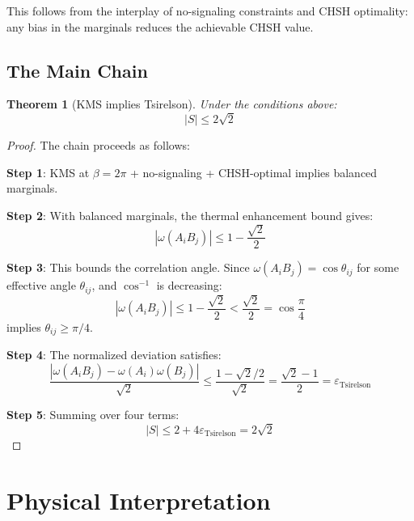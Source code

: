 \documentclass[12pt,a4paper]{article}
\newtheorem{theorem}{Theorem}[section]
\newcommand{\eps}{\varepsilon}
\begin{document}
This follows from the interplay of no-signaling constraints and CHSH optimality: any bias in the marginals reduces the achievable CHSH value.

\subsection{The Main Chain}

\begin{theorem}[KMS implies Tsirelson]
Under the conditions above:
\begin{equation}
|S| \leq 2\sqrt{2}
\end{equation}
\end{theorem}

\begin{proof}
The chain proceeds as follows:

\textbf{Step 1}: KMS at $\beta = 2\pi$ + no-signaling + CHSH-optimal implies balanced marginals.

\textbf{Step 2}: With balanced marginals, the thermal enhancement bound gives:
\begin{equation}
|\omega(A_i B_j)| \leq 1 - \frac{\sqrt{2}}{2}
\end{equation}

\textbf{Step 3}: This bounds the correlation angle. Since $\omega(A_i B_j) = \cos\theta_{ij}$ for some effective angle $\theta_{ij}$, and $\cos^{-1}$ is decreasing:
\begin{equation}
|\omega(A_i B_j)| \leq 1 - \frac{\sqrt{2}}{2} < \frac{\sqrt{2}}{2} = \cos\frac{\pi}{4}
\end{equation}
implies $\theta_{ij} \geq \pi/4$.

\textbf{Step 4}: The normalized deviation satisfies:
\begin{equation}
\frac{|\omega(A_i B_j) - \omega(A_i)\omega(B_j)|}{\sqrt{2}} \leq \frac{1 - \sqrt{2}/2}{\sqrt{2}} = \frac{\sqrt{2}-1}{2} = \eps_{\text{Tsirelson}}
\end{equation}

\textbf{Step 5}: Summing over four terms:
\begin{equation}
|S| \leq 2 + 4\eps_{\text{Tsirelson}} = 2\sqrt{2}
\end{equation}
\end{proof}

\section{Physical Interpretation}
\end{document}
